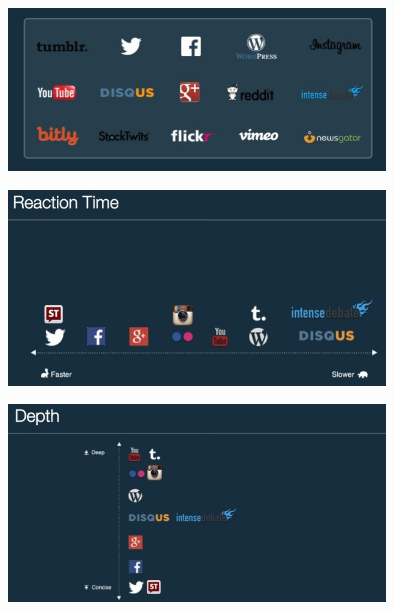 \documentclass{beamer}
\begin{document}
\begin{frame}
  \begin{center}
    \includegraphics[width=10cm]{./imgs/slide05.jpg}
  \end{center}
\end{frame}

\begin{frame}
  \begin{center}
    \includegraphics[width=10cm]{./imgs/slide06.jpg}
  \end{center}
\end{frame}

\begin{frame}
  \begin{center}
    \includegraphics[width=10cm]{./imgs/slide07.jpg}
  \end{center}
\end{frame}
\end{document}
